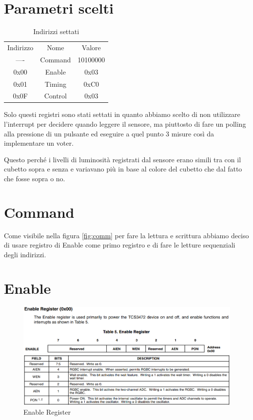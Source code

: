 \documentclass[12pt]{report}
\begin{document}
\section{Parametri scelti}
\label{sec:Parametri sensore}
\begin{table}
    \centering
    \begin{tabular}{ccc}
        Indirizzo & Nome & Valore \\
        ---- & Command & 10100000 \\
        0x00 & Enable & 0x03 \\
        0x01 & Timing & 0xC0 \\
        0x0F & Control & 0x03
    \end{tabular}
    \caption{Indirizzi settati}
    \label{tab:my_label}
\end{table}

Solo questi registri sono stati settati in quanto abbiamo scelto di non utilizzare l'interrupt per decidere quando leggere il sensore, ma piuttosto di fare un polling alla pressione di un pulsante ed eseguire a quel punto 3 misure così da implementare un voter.

Questo perché i livelli di luminosità registrati dal sensore erano simili tra con il cubetto sopra e senza e variavano più in base al colore del cubetto che dal fatto che fosse sopra o no.

\section{Command}
Come visibile nella figura \ref{fig:comm} per fare la lettura e scrittura abbiamo deciso di usare registro di Enable come primo registro e di fare le letture sequenziali degli indirizzi.

\section{Enable}

\begin{figure}
    \includegraphics[width=\textwidth]{Immagini_sensore/registro_enable.png}
    \caption{Enable Register}
\end{figure}
\end{document}

